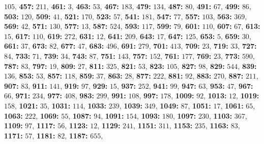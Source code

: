 $105$, \textsf{\bfseries 457:} $211$, \textsf{\bfseries 461:} $3$, \textsf{\bfseries 463:} $53$, \textsf{\bfseries 467:} $183$, \textsf{\bfseries 479:} $134$, \textsf{\bfseries 487:} $80$, \textsf{\bfseries 491:} $67$, \textsf{\bfseries 499:} $86$, \textsf{\bfseries 503:} $120$, \textsf{\bfseries 509:} $41$, \textsf{\bfseries 521:} $170$, \textsf{\bfseries 523:} $57$, \textsf{\bfseries 541:} $181$, \textsf{\bfseries 547:} $77$, 
\textsf{\bfseries 557:} $103$, \textsf{\bfseries 563:} $369$, \textsf{\bfseries 569:} $42$, \textsf{\bfseries 571:} $130$, \textsf{\bfseries 577:} $13$, \textsf{\bfseries 587:} $524$, \textsf{\bfseries 593:} $117$, \textsf{\bfseries 599:} $79$, \textsf{\bfseries 601:} $110$, \textsf{\bfseries 607:} $67$, \textsf{\bfseries 613:} $15$, \textsf{\bfseries 617:} $110$, \textsf{\bfseries 619:} $272$, \textsf{\bfseries 631:} $12$, \textsf{\bfseries 641:} $209$, \textsf{\bfseries 643:} $17$, \textsf{\bfseries 647:} $125$, \textsf{\bfseries 653:} $5$, \textsf{\bfseries 659:} $30$, \textsf{\bfseries 661:} $37$, \textsf{\bfseries 673:} $82$, \textsf{\bfseries 677:} $47$, \textsf{\bfseries 683:} $496$, \textsf{\bfseries 691:} $279$, \textsf{\bfseries 701:} $413$, \textsf{\bfseries 709:} $23$, \textsf{\bfseries 719:} $33$, \textsf{\bfseries 727:} $84$, \textsf{\bfseries 733:} $71$, \textsf{\bfseries 739:} $34$, \textsf{\bfseries 743:} $87$, \textsf{\bfseries 751:} $143$, \textsf{\bfseries 757:} $152$, \textsf{\bfseries 761:} $177$, \textsf{\bfseries 769:} $23$, \textsf{\bfseries 773:} $590$, \textsf{\bfseries 787:} $83$, \textsf{\bfseries 797:} $19$, \textsf{\bfseries 809:} $27$, \textsf{\bfseries 811:} $325$, \textsf{\bfseries 821:} $53$, \textsf{\bfseries 823:} $105$, \textsf{\bfseries 827:} $98$, \textsf{\bfseries 829:} $544$, \textsf{\bfseries 839:} $136$, \textsf{\bfseries 853:} $53$, \textsf{\bfseries 857:} $118$, \textsf{\bfseries 859:} $37$, \textsf{\bfseries 863:} $28$, \textsf{\bfseries 877:} $222$, \textsf{\bfseries 881:} $92$, \textsf{\bfseries 883:} $270$, \textsf{\bfseries 887:} $211$, \textsf{\bfseries 907:} $83$, \textsf{\bfseries 911:} $141$, \textsf{\bfseries 919:} $97$, \textsf{\bfseries 929:} $15$, \textsf{\bfseries 937:} $252$, \textsf{\bfseries 941:} $99$, \textsf{\bfseries 947:} $63$, \textsf{\bfseries 953:} $47$, \textsf{\bfseries 967:} $66$, \textsf{\bfseries 971:} $234$, \textsf{\bfseries 977:} $408$, \textsf{\bfseries 983:} $299$, \textsf{\bfseries 991:} $108$, \textsf{\bfseries 997:} $178$, \textsf{\bfseries 1009:} $92$, \textsf{\bfseries 1013:} $12$, \textsf{\bfseries 1019:} $158$, \textsf{\bfseries 1021:} $35$, \textsf{\bfseries 1031:} $114$, \textsf{\bfseries 1033:} $239$, \textsf{\bfseries 1039:} $349$, \textsf{\bfseries 1049:} $87$, \textsf{\bfseries 1051:} $17$, \textsf{\bfseries 1061:} $65$, \textsf{\bfseries 1063:} $222$, \textsf{\bfseries 1069:} $55$, \textsf{\bfseries 1087:} $94$, \textsf{\bfseries 1091:} $154$, \textsf{\bfseries 1093:} $180$, \textsf{\bfseries 1097:} $230$, \textsf{\bfseries 1103:} $367$, \textsf{\bfseries 1109:} $97$, \textsf{\bfseries 1117:} $56$, \textsf{\bfseries 1123:} $12$, \textsf{\bfseries 1129:} $241$, \textsf{\bfseries 1151:} $311$, \textsf{\bfseries 1153:} $235$, \textsf{\bfseries 1163:} $83$, \textsf{\bfseries 1171:} $57$, \textsf{\bfseries 1181:} $82$, \textsf{\bfseries 1187:} $655$, 